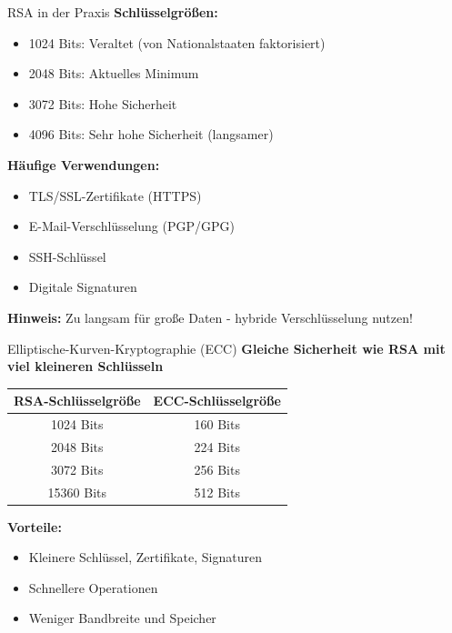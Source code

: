 \documentclass[handout]{beamer}
\begin{document}
\begin{frame}{RSA in der Praxis}
\textbf{Schlüsselgrößen:}
\begin{itemize}
    \item 1024 Bits: \alert{Veraltet} (von Nationalstaaten faktorisiert)
    \item 2048 Bits: Aktuelles Minimum
    \item 3072 Bits: Hohe Sicherheit
    \item 4096 Bits: Sehr hohe Sicherheit (langsamer)
\end{itemize}

\vspace{0.3cm}
\textbf{Häufige Verwendungen:}
\begin{itemize}
    \item TLS/SSL-Zertifikate (HTTPS)
    \item E-Mail-Verschlüsselung (PGP/GPG)
    \item SSH-Schlüssel
    \item Digitale Signaturen
\end{itemize}

\vspace{0.3cm}
\textbf{Hinweis:} Zu langsam für große Daten - hybride Verschlüsselung nutzen!
\end{frame}

\begin{frame}{Elliptische-Kurven-Kryptographie (ECC)}
\textbf{Gleiche Sicherheit wie RSA mit viel kleineren Schlüsseln}

\vspace{0.3cm}
\begin{center}
\begin{tabular}{|c|c|}
\hline
\textbf{RSA-Schlüsselgröße} & \textbf{ECC-Schlüsselgröße} \\
\hline
1024 Bits & 160 Bits \\
2048 Bits & 224 Bits \\
3072 Bits & 256 Bits \\
15360 Bits & 512 Bits \\
\hline
\end{tabular}
\end{center}

\vspace{0.3cm}
\textbf{Vorteile:}
\begin{itemize}
    \item Kleinere Schlüssel, Zertifikate, Signaturen
    \item Schnellere Operationen
    \item Weniger Bandbreite und Speicher
\end{itemize}

\end{frame}
\end{document}
